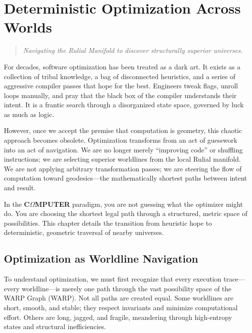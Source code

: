 \chapter{Deterministic Optimization Across Worlds}
\label{chapter-18-deterministic-optimization-across-worlds}

\begin{quote}
\emph{Navigating the Rulial Manifold to discover structurally superior universes.}
\end{quote}

For decades, software optimization has been treated as a dark art. It exists as a collection of tribal knowledge, a bag of disconnected heuristics, and a series of aggressive compiler passes that hope for the best. Engineers tweak flags, unroll loops manually, and pray that the black box of the compiler understands their intent. It is a frantic search through a disorganized state space, governed by luck as much as logic.

However, once we accept the premise that computation is geometry, this chaotic approach becomes obsolete. Optimization transforms from an act of guesswork into an act of navigation. We are no longer merely ``improving code'' or shuffling instructions; we are selecting superior worldlines from the local Rulial manifold. We are not applying arbitrary transformation passes; we are steering the flow of computation toward geodesics—the mathematically shortest paths between intent and result.

In the \textbf{C$\Omega$MPUTER} paradigm, you are not guessing what the optimizer might do. You are choosing the shortest legal path through a structured, metric space of possibilities. This chapter details the transition from heuristic hope to deterministic, geometric traversal of nearby universes.

\section{Optimization as Worldline Navigation}
\label{optimization-as-worldline-navigation}

To understand optimization, we must first recognize that every execution trace—every worldline—is merely one path through the vast possibility space of the WARP Graph (WARP). Not all paths are created equal. Some worldlines are short, smooth, and stable; they respect invariants and minimize computational effort. Others are long, jagged, and fragile, meandering through high-entropy states and structural inefficiencies.

